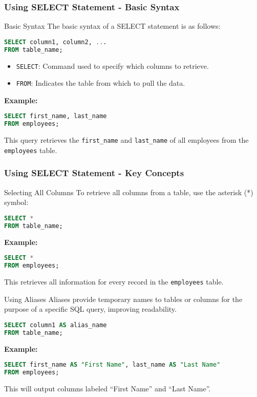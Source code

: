\documentclass[aspectratio=169]{beamer}
\begin{document}
\begin{frame}[fragile]
    \frametitle{Using SELECT Statement - Basic Syntax}
    \begin{block}{Basic Syntax}
        The basic syntax of a SELECT statement is as follows:
        \begin{lstlisting}[language=SQL]
SELECT column1, column2, ...
FROM table_name;
        \end{lstlisting}
        \begin{itemize}
            \item \texttt{SELECT}: Command used to specify which columns to retrieve.
            \item \texttt{FROM}: Indicates the table from which to pull the data.
        \end{itemize}
        \textbf{Example:}
        \begin{lstlisting}[language=SQL]
SELECT first_name, last_name
FROM employees;
        \end{lstlisting}
        This query retrieves the \texttt{first\_name} and \texttt{last\_name} 
        of all employees from the \texttt{employees} table.
    \end{block}
\end{frame}

\begin{frame}[fragile]
    \frametitle{Using SELECT Statement - Key Concepts}
    \begin{block}{Selecting All Columns}
        To retrieve all columns from a table, use the asterisk (*) symbol:
        \begin{lstlisting}[language=SQL]
SELECT * 
FROM table_name;
        \end{lstlisting}
        \textbf{Example:}
        \begin{lstlisting}[language=SQL]
SELECT * 
FROM employees;
        \end{lstlisting}
        This retrieves all information for every record in the \texttt{employees} table.
    \end{block}

    \begin{block}{Using Aliases}
        Aliases provide temporary names to tables or columns for the purpose of 
        a specific SQL query, improving readability.
        \begin{lstlisting}[language=SQL]
SELECT column1 AS alias_name
FROM table_name;
        \end{lstlisting}
        \textbf{Example:}
        \begin{lstlisting}[language=SQL]
SELECT first_name AS "First Name", last_name AS "Last Name"
FROM employees;
        \end{lstlisting}
        This will output columns labeled ``First Name'' and ``Last Name''.
    \end{block}
\end{frame}
\end{document}
